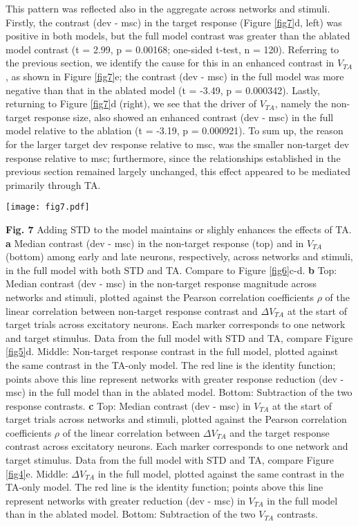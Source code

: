 \documentclass[pdflatex,referee,iicol,sn-basic]{sn-jnl}
\theoremstyle{thmstyleone}%
\theoremstyle{thmstyletwo}%
\theoremstyle{thmstylethree}%
\begin{document}
This pattern was reflected also in the aggregate across networks and stimuli. Firstly, the contrast (dev - msc) in the target response (Figure \ref{fig7}d, left) was positive in both models, but the full model contrast was greater than the ablated model contrast (t = 2.99, p = 0.00168; one-sided t-test, n = 120). Referring to the previous section, we identify the cause for this in an enhanced contrast in $V_{TA}$, as shown in Figure \ref{fig7}e; the contrast (dev - msc) in the full model was more negative than that in the ablated model (t = -3.49, p = 0.000342). Lastly, returning to Figure \ref{fig7}d (right), we see that the driver of $V_{TA}$, namely the non-target response size, also showed an enhanced contrast (dev - msc) in the full model relative to the ablation (t = -3.19, p = 0.000921). To sum up, the reason for the larger target dev response relative to msc, was the smaller non-target dev response relative to msc; furthermore, since the relationships established in the previous section remained largely unchanged, this effect appeared to be mediated primarily through TA.

\begin{figure*}%
    \centering
    \texttt{[image: fig7.pdf]}
    \caption{}
    \label{fig7}
\end{figure*}
\textbf{Fig. 7} Adding STD to the model maintains or slighly enhances the effects of TA.
\textbf{a} Median contrast (dev - msc) in the non-target response (top) and in $V_{TA}$ (bottom) among early and late neurons, respectively, across networks and stimuli, in the full model with both STD and TA. Compare to Figure \ref{fig6}c-d.
\textbf{b} Top: Median contrast (dev - msc) in the non-target response magnitude across networks and stimuli, plotted against the Pearson correlation coefficients $\rho$ of the linear correlation between non-target response contrast and $\Delta V_{TA}$ at the start of target trials across excitatory neurons. Each marker corresponds to one network and target stimulus. Data from the full model with STD and TA, compare Figure \ref{fig5}d. Middle: Non-target response contrast in the full model, plotted against the same contrast in the TA-only model. The red line is the identity function; points above this line represent networks with greater response reduction (dev - msc) in the full model than in the ablated model. Bottom: Subtraction of the two response contrasts.
\textbf{c} Top: Median contrast (dev - msc) in $V_{TA}$ at the start of target trials across networks and stimuli, plotted against the Pearson correlation coefficients $\rho$ of the linear correlation between $\Delta V_{TA}$ and the target response contrast across excitatory neurons. Each marker corresponds to one network and target stimulus. Data from the full model with STD and TA, compare Figure \ref{fig4}e. Middle: $\Delta V_{TA}$ in the full model, plotted against the same contrast in the TA-only model. The red line is the identity function; points above this line represent networks with greater reduction (dev - msc) in $V_{TA}$ in the full model than in the ablated model. Bottom: Subtraction of the two $V_{TA}$ contrasts.
\end{document}
